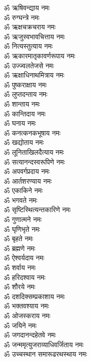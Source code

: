 \begin{multicols}{2}
\begin{flushleft}
        ॐ ऋषिवन्द्याय नमः\\
        ॐ रुग्घन्त्रे नमः\\
        ॐ ऋक्षचक्रचराय नमः\\
        ॐ ऋजुस्वभावचित्ताय नमः\hfill{}\\
        ॐ नित्यस्तुत्याय नमः\\
        ॐ ऋकारमातृकावर्णरूपाय नमः\\
        ॐ उज्ज्वलतेजसे नमः\\
        ॐ ऋक्षाधिनाथमित्राय नमः\\
        ॐ पुष्कराक्षाय नमः\\
        ॐ लुप्तदन्ताय नमः\\
        ॐ शान्ताय नमः\\
        ॐ कान्तिदाय नमः\\
        ॐ घनाय नमः\\
        ॐ कनत्कनकभूषाय नमः\hfill{}\\
        ॐ खद्योताय नमः\\
        ॐ लूनिताखिलदैत्याय नमः\\
        ॐ सत्यानन्दस्वरूपिणे नमः\\
        ॐ अपवर्गप्रदाय नमः\\
        ॐ आर्तशरण्याय नमः\\
        ॐ एकाकिने नमः\\
        ॐ भगवते नमः\\
        ॐ सृष्टिस्थित्यन्तकारिणे नमः\\
        ॐ गुणात्मने नमः\\
        ॐ घृणिभृते नमः\hfill{}\\
        ॐ बृहते नमः\\
        ॐ ब्रह्मणे नमः\\
        ॐ ऐश्वर्यदाय नमः\\
        ॐ शर्वाय नमः\\
        ॐ हरिदश्वाय नमः\\
        ॐ शौरये नमः\\
        ॐ दशदिक्सम्प्रकाशाय नमः\\
        ॐ भक्तवश्याय नमः\\
        ॐ ओजस्कराय नमः\\
        ॐ जयिने नमः\hfill{}\\
        ॐ जगदानन्दहेतवे नमः\\
        ॐ जन्ममृत्युजराव्याधिवर्जिताय नमः\\
        ॐ उच्चस्थान समारूढरथस्थाय नमः\\

\end{flushleft}
\end{multicols}
